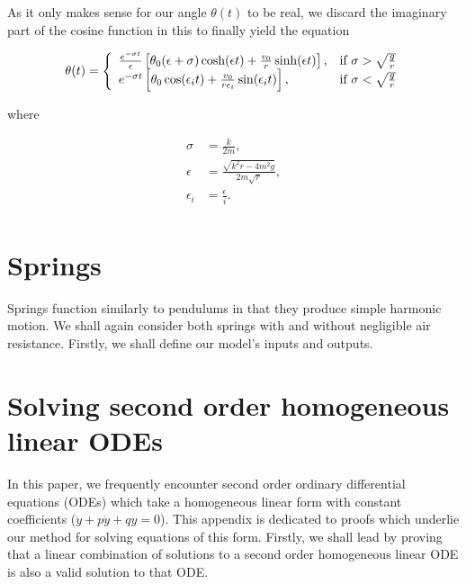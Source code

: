 \documentclass{article}
\begin{document}
As it only makes sense for our angle $\theta(t)$ to be real, we discard the imaginary part of the cosine function in this to finally yield the equation

\begin{equation*}
	\theta(t) = 
	\Bigg\{
		\begin{array}{lr}
			\frac{e^{-\sigma t}}{\epsilon}\left[\theta_0(\epsilon + \sigma)\cosh(\epsilon t) + \frac{v_0}{r}\sinh(\epsilon t)\right], & \textnormal{if }  \sigma > \sqrt{\frac{g}{r}} \\
			e^{-\sigma t}\left[\theta_0\cos(\epsilon_it) + \frac{v_0}{r\epsilon_i}\sin(\epsilon_it)\right], & \textnormal{if } \sigma < \sqrt{\frac{g}{r}}
		\end{array}
\end{equation*}

where

\begin{align*}
	\sigma &= \frac{k}{2m}, \\
	\epsilon &= \frac{\sqrt{k^2r-4m^2g}}{2m\sqrt{r}}, \\
	\epsilon_i &= \frac{\epsilon}{i}. \\
\end{align*}

\section{Springs}

Springs function similarly to pendulums in that they produce simple harmonic motion. We shall again consider both springs with and without negligible air resistance. Firstly, we shall define our model's inputs and outputs.

\newpage

\appendix

\section{Solving second order homogeneous linear ODEs}

In this paper, we frequently encounter second order ordinary differential equations (ODEs) which take a homogeneous linear form with constant coefficients ($\ddot{y} + p\dot{y} + qy = 0$). This appendix is dedicated to proofs which underlie our method for solving equations of this form. Firstly, we shall lead by proving that a linear combination of solutions to a second order homogeneous linear ODE is also a valid solution to that ODE.
\end{document}
